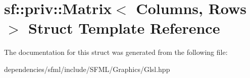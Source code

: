 \hypertarget{structsf_1_1priv_1_1_matrix}{}\section{sf\+:\+:priv\+:\+:Matrix$<$ Columns, Rows $>$ Struct Template Reference}
\label{structsf_1_1priv_1_1_matrix}


The documentation for this struct was generated from the following file\+:\begin{DoxyCompactItemize}
\item 
dependencies/sfml/include/\+S\+F\+M\+L/\+Graphics/Glsl.\+hpp\end{DoxyCompactItemize}
